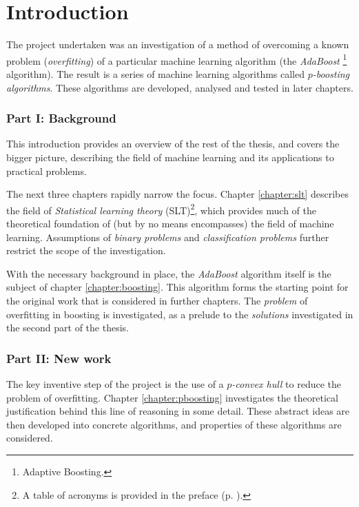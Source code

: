 
\chapter{Introduction}
\label{chapter:intro}

The project undertaken was an investigation of a method of
overcoming a known problem (\emph{overfitting}) of a particular
machine learning algorithm (the \emph{AdaBoost}%
\footnote{Adaptive Boosting.}
algorithm).  The result is a series of machine learning algorithms
called \emph{$p$-boosting algorithms}.  These algorithms are
developed, analysed and tested in later chapters.

\subsection*{Part I: Background}

This introduction provides an overview of the rest of the thesis, and
covers the bigger picture, describing the field of machine learning
and its applications to practical problems.

The next three chapters rapidly narrow the focus.  Chapter
\ref{chapter:slt} describes the field of \emph{Statistical learning
theory} (SLT)\footnote{A table of acronyms is provided in the
preface (p. \pageref{acronyms}).}, which provides much of the
theoretical foundation of (but by no means encompasses) the field of
machine learning.  Assumptions of \emph{binary problems} and
\emph{classification problems} further restrict the scope of the
investigation.

With the necessary background in place, the \emph{AdaBoost} algorithm
itself is the subject of chapter \ref{chapter:boosting}.  This
algorithm forms the starting point for the original work that is
considered in further chapters.  The \emph{problem} of overfitting in
boosting is investigated, as a prelude to the \emph{solutions}
investigated in the second part of the thesis. 


\subsection*{Part II: New work}

The key inventive step of the project is the use of a \emph{$p$-convex
hull} to reduce the problem of overfitting.  Chapter
\ref{chapter:pboosting} investigates the theoretical justification
behind this line of reasoning in some detail.  These abstract ideas
are then developed into concrete algorithms, and properties of these
algorithms are considered.

